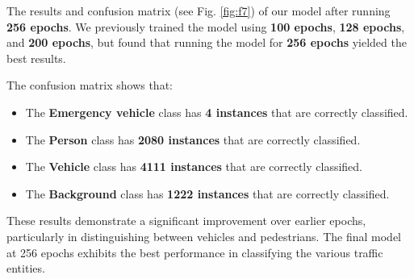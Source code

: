 \documentclass[usenatbib]{tjaa}
\begin{document}
The results and confusion matrix (see Fig. \ref{fig:f7}) of our model after running \textbf{256 epochs}. We previously trained the model using \textbf{100 epochs}, \textbf{128 epochs}, and \textbf{200 epochs}, but found that running the model for \textbf{256 epochs} yielded the best results. 

The confusion matrix shows  that:
\begin{itemize}
    \item The \textbf{Emergency vehicle} class has \textbf{4 instances} that are correctly classified.
    \item The \textbf{Person} class has \textbf{2080 instances} that are correctly classified.
    \item The \textbf{Vehicle} class has \textbf{4111 instances} that are correctly classified.
    \item The \textbf{Background} class has \textbf{1222 instances} that are correctly classified.
\end{itemize}

These results demonstrate a significant improvement over earlier epochs, particularly in distinguishing between vehicles and pedestrians. The final model at 256 epochs exhibits the best performance in classifying the various traffic entities.
\end{document}

